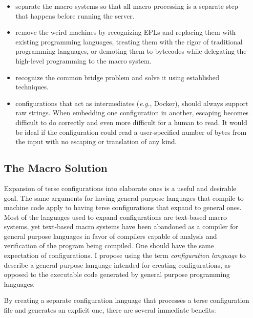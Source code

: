 \documentclass[letterpaper,twocolumn,10pt]{article}
\begin{document}
\begin{itemize}
\item separate the macro systems so that all macro processing is a separate step that happens before running the server.
\item remove the weird machines by recognizing EPLs and replacing them with existing programming languages, treating them with the rigor of traditional programming languages, or demoting them to bytecodes while delegating the high-level programming to the macro system.
\item recognize the common bridge problem and solve it using established techniques.
\item configurations that act as intermediates (\emph{e.g.}, Docker), should always support raw strings. When embedding one configuration in another, escaping becomes difficult to do correctly and even more difficult for a human to read. It would be ideal if the configuration could read a user-specified number of bytes from the input with no escaping or translation of any kind.
\end{itemize}

\subsection{The Macro Solution}
Expansion of terse configurations into elaborate ones is a useful and desirable goal. The same arguments for having general purpose languages that compile to machine code apply to having terse configurations that expand to general ones. Most of the languages used to expand configurations are text-based macro systems, yet text-based macro systems have been abandoned as a compiler for general purpose languages in favor of compilers capable of analysis and verification of the program being compiled. One should have the same expectation of configurations. I propose using the term \emph{configuration language} to describe a general purpose language intended for creating configurations, as opposed to the executable code generated by general purpose programming languages.

By creating a separate configuration language that processes a terse configuration file and generates an explicit one, there are several immediate benefits:
\end{document}

